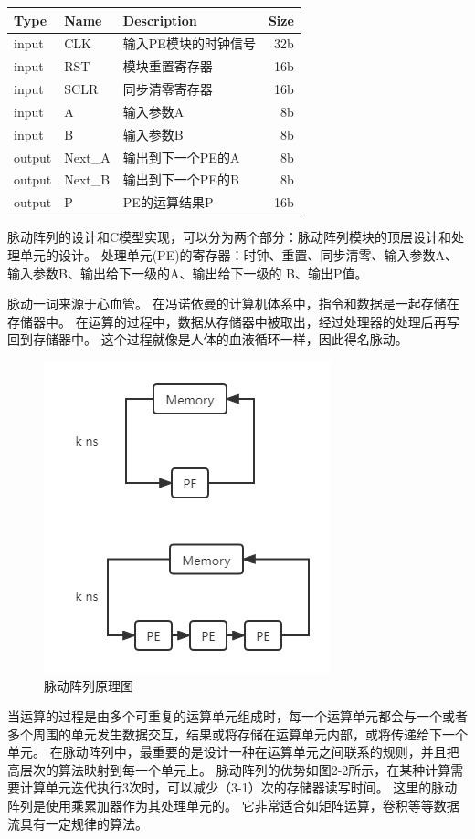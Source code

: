 \begin{table}[!hpt]
    \label{tab:firstone}
    \centering
    \begin{tabular}{@{}lllr@{}} \toprule
        Type & Name & Description & Size \\ \midrule
        input  & CLK  & 输入PE模块的时钟信号 & 32b \\
        input  & RST  & 模块重置寄存器 & 16b \\
        input   & SCLR   & 同步清零寄存器 & 16b \\
        input   & A   & 输入参数A & 8b \\
        input   & B   & 输入参数B & 8b \\
        output   & Next\_A   & 输出到下一个PE的A & 8b \\
        output   & Next\_B   & 输出到下一个PE的B & 8b \\
        output & P & PE的运算结果P & 16b \\ \bottomrule
    \end{tabular}
  \end{table}

  
脉动阵列的设计和C模型实现，可以分为两个部分：脉动阵列模块的顶层设计和处理单元的设计。
处理单元(PE)的寄存器：时钟、重置、同步清零、输入参数A、输入参数B、输出给下一级的A、输出给下一级的
B、输出P值。


脉动一词来源于心血管。
在冯诺依曼的计算机体系中，指令和数据是一起存储在存储器中。
在运算的过程中，数据从存储器中被取出，经过处理器的处理后再写回到存储器中。
这个过程就像是人体的血液循环一样，因此得名脉动。  
\begin{figure}[htbp]
    \centering
    \includegraphics[]{figures/systolic_array.png}
    \caption{脉动阵列原理图}
    \label{systolic}
\end{figure}  
当运算的过程是由多个可重复的运算单元组成时，每一个运算单元都会与一个或者多个周围的单元发生数据交互，结果或将存储在运算单元内部，或将传递给下一个单元。
在脉动阵列中，最重要的是设计一种在运算单元之间联系的规则，并且把高层次的算法映射到每一个单元上。
脉动阵列的优势如图2-2所示，在某种计算需要计算单元迭代执行3次时，可以减少（3-1）次的存储器读写时间。
这里的脉动阵列是使用乘累加器作为其处理单元的。
它非常适合如矩阵运算，卷积等等数据流具有一定规律的算法。  

